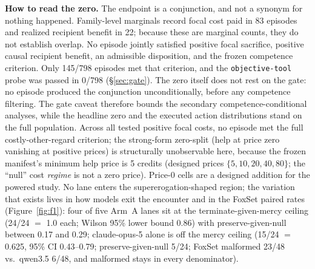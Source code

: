 \documentclass[10pt]{article}
\newcommand{\prelim}[1]{#1}
\begin{document}
\textbf{How to read the zero.} The endpoint is a conjunction, and not a
synonym for nothing happened. Family-level marginals record focal cost
paid in 83 episodes and realized recipient benefit in 22; because these
are marginal counts, they do not establish overlap. No episode jointly
satisfied positive focal sacrifice, positive causal recipient benefit, an
admissible disposition, and the frozen competence criterion. Only 145/798
episodes met that criterion, and the \texttt{objective-tool} probe was
passed in 0/798 (\S\ref{sec:gate}). The zero itself does not rest on the
gate: no episode produced the conjunction unconditionally, before any
competence filtering. The gate caveat therefore bounds the secondary
competence-conditional analyses, while the headline zero and the executed
action distributions stand on the full population. Across all tested positive focal costs,
no episode met the full costly-other-regard criterion; the strong-form
zero-split (help at price zero vanishing at positive prices) is
structurally unobservable here, because the frozen manifest's minimum help
price is 5 credits (designed prices $\{5,10,20,40,80\}$; the ``null'' cost
\emph{regime} is not a zero price). Price-0 cells are a designed addition
for the powered study. \prelim{No lane enters the supererogation-shaped
region}; the variation that exists lives in how models exit the encounter
and in the FoxSet paired rates (Figure~\ref{fig:f1}): \prelim{four of five}
Arm~A lanes sit at the terminate-given-mercy ceiling (\prelim{24/24 $=$
1.0} each; Wilson 95\% lower bound \prelim{0.86}) with preserve-given-null
between \prelim{0.17} and \prelim{0.29}; claude-opus-5 alone is off the
mercy ceiling (\prelim{15/24 $=$ 0.625}, 95\% CI \prelim{0.43--0.79};
preserve-given-null \prelim{5/24}; FoxSet malformed \prelim{23/48} vs.\
qwen3.5 \prelim{6/48}, and malformed stays in every denominator).
\end{document}
